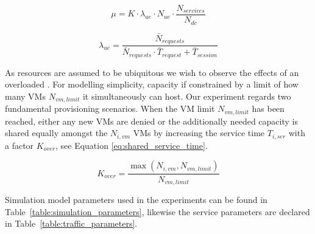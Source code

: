 \begin{equation}
	\label{eq:service_rate}
	\mu = K \cdot  \lambda_{ue} \cdot N_{ue} \cdot \frac{ N_{services}}{N_{dc}} 
\end{equation}

\begin{equation}
	\label{eq:service_time}
	\lambda_{ue} = \frac{ \bar{N}_{requests} }{\bar{N}_{requests} \cdot \bar{T}_{request} + \bar{T}_{session} }
\end{equation}

As resources are assumed to be ubiquitous we wish to observe the effects of an overloaded \dc{}. For modelling simplicity, \dc{} capacity if constrained by a limit of how many VMs $N_{vm,limit}$ it simultaneously can host. Our experiment regards two fundamental provisioning scenarios. When the VM limit $N_{vm,limit}$ has been reached, either any new VMs are denied or the additionally needed \dc{} capacity is shared equally amongst the $N_{i,vm}$ VMs by increasing the service time $T_{i,ser}$ with a factor $K_{over}$, see Equation \ref{eq:shared_service_time}.

\begin{equation}
	\label{eq:shared_service_time}
	K_{over} = \frac{ \max(N_{i,vm},N_{vm,limit}) }{ N_{vm,limit} }
\end{equation}



Simulation model parameters used in the experiments can be found in Table~\ref{table:simulation_parameters}, likewise the service parameters are declared in Table~\ref{table:traffic_parameters}.



